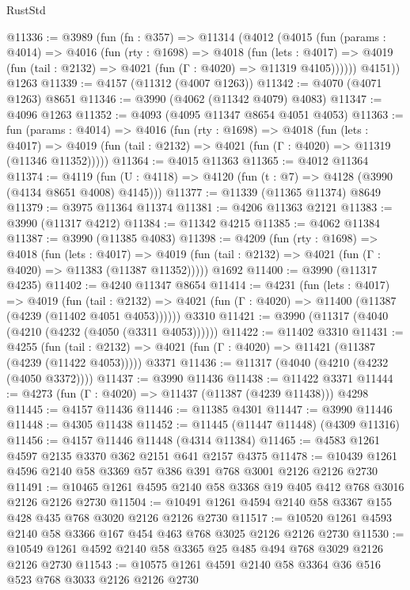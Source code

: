 \begin{lexlean}{RustStd}
\begin{coremodule}
{\begin{coremodule}
{{{{{{{{{{{{{{{{@11336 := @3989
    (fun (fn : @357) =>
    @11314
      (@4012
        (@4015
          (fun (params : @4014) =>
          @4016
            (fun (rty : @1698) =>
            @4018
              (fun (lets : @4017) =>
              @4019 (fun (tail : @2132) => @4021 (fun (Γ : @4020) => @11319 @4105))))))
        @4151))
    @1263
@11339 := @4157 (@11312 (@4007 @1263))
@11342 := @4070 (@4071 @1263) @8651
@11346 := @3990 (@4062 (@11342 @4079) @4083)
@11347 := @4096 @1263
@11352 := @4093 (@4095 @11347 @8654 @4051 @4053)
@11363 := fun (params : @4014) =>
  @4016
    (fun (rty : @1698) =>
    @4018
      (fun (lets : @4017) =>
      @4019 (fun (tail : @2132) => @4021 (fun (Γ : @4020) => @11319 (@11346 @11352)))))
@11364 := @4015 @11363
@11365 := @4012 @11364
@11374 := @4119 (fun (U : @4118) => @4120 (fun (t : @7) => @4128 (@3990 (@4134 @8651 @4008) @4145)))
@11377 := @11339 (@11365 @11374) @8649
@11379 := @3975 @11364 @11374
@11381 := @4206 @11363 @2121
@11383 := @3990 (@11317 @4212)
@11384 := @11342 @4215
@11385 := @4062 @11384
@11387 := @3990 (@11385 @4083)
@11398 := @4209
    (fun (rty : @1698) =>
    @4018
      (fun (lets : @4017) =>
      @4019 (fun (tail : @2132) => @4021 (fun (Γ : @4020) => @11383 (@11387 @11352)))))
    @1692
@11400 := @3990 (@11317 @4235)
@11402 := @4240 @11347 @8654
@11414 := @4231
    (fun (lets : @4017) =>
    @4019
      (fun (tail : @2132) =>
      @4021 (fun (Γ : @4020) => @11400 (@11387 (@4239 (@11402 @4051 @4053))))))
    @3310
@11421 := @3990 (@11317 (@4040 (@4210 (@4232 (@4050 (@3311 @4053))))))
@11422 := @11402 @3310
@11431 := @4255
    (fun (tail : @2132) => @4021 (fun (Γ : @4020) => @11421 (@11387 (@4239 (@11422 @4053)))))
    @3371
@11436 := @11317 (@4040 (@4210 (@4232 (@4050 @3372))))
@11437 := @3990 @11436
@11438 := @11422 @3371
@11444 := @4273 (fun (Γ : @4020) => @11437 (@11387 (@4239 @11438))) @4298
@11445 := @4157 @11436
@11446 := @11385 @4301
@11447 := @3990 @11446
@11448 := @4305 @11438
@11452 := @11445 (@11447 @11448) (@4309 @11316)
@11456 := @4157 @11446 @11448 (@4314 @11384)
@11465 := @4583 @1261 @4597 @2135 @3370 @362 @2151 @641 @2157 @4375
@11478 := @10439 @1261 @4596 @2140 @58 @3369 @57 @386 @391 @768 @3001 @2126 @2126 @2730
@11491 := @10465 @1261 @4595 @2140 @58 @3368 @19 @405 @412 @768 @3016 @2126 @2126 @2730
@11504 := @10491 @1261 @4594 @2140 @58 @3367 @155 @428 @435 @768 @3020 @2126 @2126 @2730
@11517 := @10520 @1261 @4593 @2140 @58 @3366 @167 @454 @463 @768 @3025 @2126 @2126 @2730
@11530 := @10549 @1261 @4592 @2140 @58 @3365 @25 @485 @494 @768 @3029 @2126 @2126 @2730
@11543 := @10575 @1261 @4591 @2140 @58 @3364 @36 @516 @523 @768 @3033 @2126 @2126 @2730
}}}}}}}}}}}}}}}}
\end{coremodule}}
\end{coremodule}
\end{lexlean}
